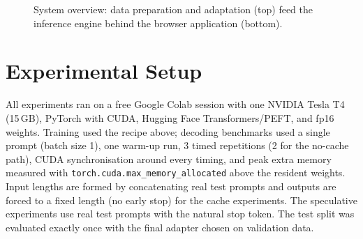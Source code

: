 \documentclass[conference]{IEEEtran}
\begin{document}
\begin{figure}[t]
\centering
{}
\caption{System overview: data preparation and adaptation (top) feed the inference engine behind the browser application (bottom).}
\label{fig:sys}
\end{figure}

\section{Experimental Setup}
All experiments ran on a free Google Colab session with one NVIDIA Tesla T4 (15\,GB), PyTorch with CUDA, Hugging Face Transformers/PEFT, and fp16 weights. Training used the recipe above; decoding benchmarks used a single prompt (batch size 1), one warm-up run, 3 timed repetitions (2 for the no-cache path), CUDA synchronisation around every timing, and peak extra memory measured with \texttt{torch.cuda.max\_memory\_allocated} above the resident weights. Input lengths are formed by concatenating real test prompts and outputs are forced to a fixed length (no early stop) for the cache experiments. The speculative experiments use real test prompts with the natural stop token. The test split was evaluated exactly once with the final adapter chosen on validation data.


\end{document}
